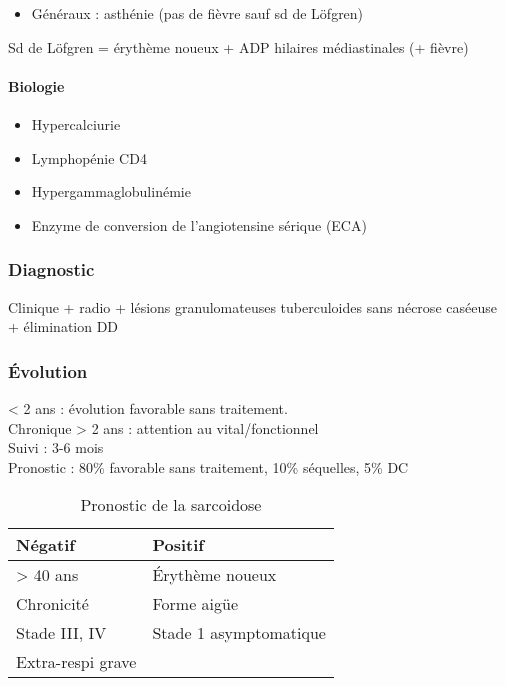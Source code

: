 \documentclass[11pt]{article}
\begin{document}
\begin{itemize}
\item Généraux : asthénie (pas de fièvre sauf sd de Löfgren)
\end{itemize}

Sd de Löfgren = érythème noueux + ADP hilaires médiastinales (+ fièvre)
\paragraph{Biologie}
\label{sec:orgfb503e0}
\label{sec:orgbfe5d87}

\begin{itemize}
\item Hypercalciurie
\item Lymphopénie CD4
\item Hypergammaglobulinémie
\item Enzyme de conversion de l'angiotensine sérique (ECA)
\end{itemize}

\subsubsection{Diagnostic}
\label{sec:org62cfdb3}
\label{sec:org6670330}
Clinique + radio + lésions granulomateuses tuberculoides sans nécrose caséeuse +
élimination DD
\subsubsection{Évolution}
\label{sec:org8f09bcc}
\label{sec:org707f9ea}
< 2 ans : évolution favorable sans traitement.\\
Chronique > 2 ans : attention au vital/fonctionnel \\
Suivi : 3-6 mois\\
Pronostic : 80\% favorable sans traitement, 10\% séquelles, 5\% DC

\begin{table}[htbp]
  \caption{Pronostic de la sarcoidose}
  \centering
  \begin{tabular}{ll}
    \toprule
    Négatif & Positif\\
    \midrule
    > 40 ans & Érythème noueux\\
    Chronicité & Forme aigüe\\
    Stade III, IV & Stade 1 asymptomatique\\
    Extra-respi grave & \\
    \bottomrule
  \end{tabular}
\end{table}
\end{document}
